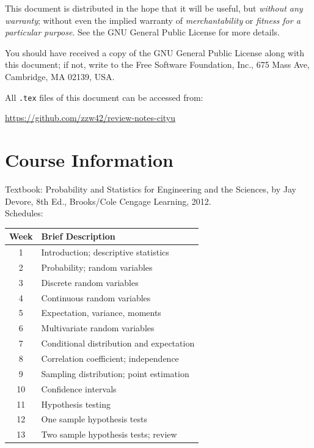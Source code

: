 \documentclass[UTF8,a4paper,10pt,openany]{book}
\theoremstyle{plain}
\theoremstyle{definition}
\begin{document}
This document is distributed in the hope that it will be useful, but \emph{without any warranty}; without even the implied warranty of \emph{merchantability} or \emph{fitness for a particular purpose}. See the GNU General Public License for more details.

You should have received a copy of the GNU General Public License along with this document; if not, write to the Free Software Foundation, Inc., 675 Mass Ave, Cambridge, MA 02139, USA.

All \texttt{.tex} files of this document can be accessed from:

\url{https://github.com/zzw42/review-notes-cityu}

\newpage

\section*{Course Information}
Textbook: Probability and Statistics for Engineering and the Sciences, by Jay Devore, 8th Ed., Brooks/Cole Cengage Learning, 2012. 
\\

Schedules:

\begin{center}
\begin{tabular}{cl}
\hline\hline
Week & Brief Description \\
\hline
1 & Introduction; descriptive statistics \\
2 & Probability; random variables \\
3 & Discrete random variables \\
4 & Continuous random variables \\
5 & Expectation, variance, moments \\
6 & Multivariate random variables \\
7 & Conditional distribution and expectation \\
8 & Correlation coefficient; independence \\
9 & Sampling distribution; point estimation \\
10 & Confidence intervals  \\
11 & Hypothesis testing \\
12 & One sample hypothesis tests \\
13 & Two sample hypothesis tests; review \\
\hline\hline
\end{tabular}
\end{center}

\tableofcontents
\listoffigures

\mainmatter
\clearpage
\setcounter{page}{1}







\end{document}

